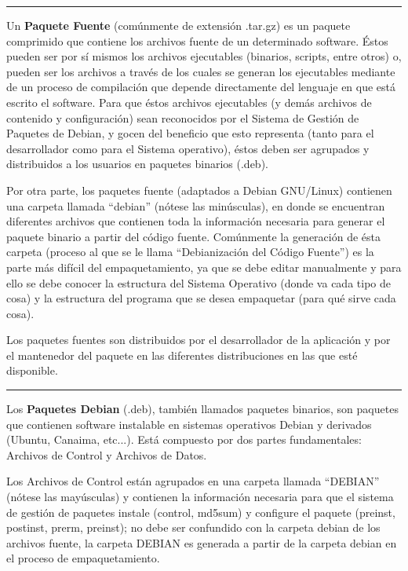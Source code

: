 \documentclass[letterpaper,12pt,spanish]{manual}
\begin{document}
\bigskip\hrule{}\bigskip


Un \textbf{Paquete Fuente} (comúnmente de extensión .tar.gz) es un paquete comprimido que contiene los archivos fuente de un determinado software. Éstos pueden ser por sí mismos los archivos ejecutables (binarios, scripts, entre otros) o, pueden ser los archivos a través de los cuales se generan los ejecutables mediante de un proceso de compilación que depende directamente del lenguaje en que está escrito el software. Para que éstos archivos ejecutables (y demás archivos de contenido y configuración) sean reconocidos por el Sistema de Gestión de Paquetes de Debian, y gocen del beneficio que esto representa (tanto para el desarrollador como para el Sistema operativo), éstos deben ser agrupados y distribuidos a los usuarios en paquetes binarios (.deb).

Por otra parte, los paquetes fuente (adaptados a Debian GNU/Linux) contienen una carpeta llamada “debian” (nótese las minúsculas), en donde se encuentran diferentes archivos que contienen toda la información necesaria para generar el paquete binario a partir del código fuente. Comúnmente la generación de ésta carpeta (proceso al que se le llama “Debianización del Código Fuente”) es la parte más difícil del empaquetamiento, ya que se debe editar manualmente y para ello se debe conocer la estructura del Sistema Operativo (donde va cada tipo de cosa) y la estructura del programa que se desea empaquetar (para qué sirve cada cosa).

Los paquetes fuentes son distribuidos por el desarrollador de la aplicación y por el mantenedor del paquete en las diferentes distribuciones en las que esté disponible.


\bigskip\hrule{}\bigskip


Los \textbf{Paquetes Debian} (.deb), también llamados paquetes binarios, son paquetes que contienen software instalable en sistemas operativos Debian y derivados (Ubuntu, Canaima, etc...). Está compuesto por dos partes fundamentales: Archivos de Control y Archivos de Datos.

Los Archivos de Control están agrupados en una carpeta llamada “DEBIAN” (nótese las mayúsculas) y contienen la información necesaria para que el sistema de gestión de paquetes instale (control, md5sum) y configure el paquete (preinst, postinst, prerm, preinst); no debe ser confundido con la carpeta debian de los archivos fuente, la carpeta DEBIAN es generada a partir de la carpeta debian en el proceso de empaquetamiento.
\end{document}
